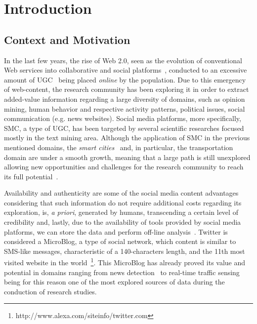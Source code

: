 \chapter{Introduction} \label{chap:intro}

\minitoc \mtcskip \noindent

\section{Context and Motivation}\label{sec:context_motivation}

In the last few years, the rise of Web 2.0, seen as the evolution of conventional Web services into collaborative and social platforms~\cite{chi2008social}, conducted to an excessive amount of \gls{UGC}~\cite{kaplan2010users} being placed \textit{online} by the population. Due to this emergency of web-content, the research community has been exploring it in order to extract added-value information regarding a large diversity of domains, such as opinion mining, human behavior and respective activity patterns, political issues, social communication (e.g. news websites). Social media platforms, more specifically, \gls{SMC}, a type of \gls{UGC}, has been targeted by several scientific researches focused mostly in the text mining area. Although the application of SMC in the previous mentioned domains, the \textit{smart cities}~\cite{batty2012smart} and, in particular, the transportation~\cite{gal2014potential} domain are under a smooth growth, meaning that a large path is still unexplored allowing new opportunities and challenges for the research community to reach its full potential~\cite{musto2015crowdpulse}.

Availability and authenticity are some of the social media content advantages considering that such information do not require additional costs regarding its exploration, is, \textit{a priori}, generated by humans, transcending a certain level of credibility and, lastly, due to the availability of tools provided by social media platforms, we can store the data and perform off-line analysis~\cite{kuflik2017automating}. Twitter is considered a \gls{MicroBlog}, a type of social network, which content is similar to SMS-like messages, characteristic of a 140-characters length, and the 11th most visited website in the world~\footnote{http://www.alexa.com/siteinfo/twitter.com}. This \gls{MicroBlog} has already proved its value and potential in domains ranging from news detection~\cite{kn:Sankaranarayanan2009} to real-time traffic sensing~\cite{carvalho2010real} being for this reason one of the most explored sources of data during the conduction of research studies.

